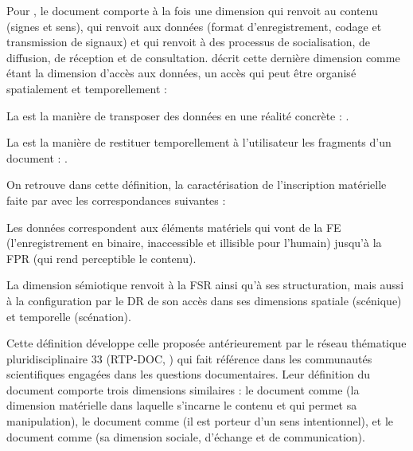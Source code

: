 Pour \cite{Leleu-Merviel2004}, le document comporte à la fois une dimension  qui renvoit au contenu (signes et sens),  qui renvoit aux données (format d'enregistrement, codage et transmission de signaux) et  qui renvoit à des processus de socialisation, de diffusion, de réception et de consultation.
\cite{Leleu-Merviel2005} décrit cette dernière dimension comme étant la dimension d'accès aux données, un accès qui peut être organisé spatialement et temporellement :
\begin{liste}
	\item La  est la manière de transposer des données en une réalité concrète : . %
	\item La  est la manière de restituer temporellement à l'utilisateur les fragments d'un document : . %
\end{liste}

On retrouve dans cette définition, la caractérisation de l'inscription matérielle faite par \cite{bachimont:icc} avec les correspondances suivantes : 
\begin{liste}
	\item Les données correspondent aux éléments matériels qui vont de la FE (l'enregistrement en binaire, inaccessible et illisible pour l'humain) jusqu'à la FPR (qui rend perceptible le contenu). 
	\item La dimension sémiotique renvoit à la FSR ainsi qu'à ses structuration, mais aussi à la configuration par le DR de son accès dans ses dimensions spatiale (scénique) et temporelle (scénation).
\end{liste}

Cette définition développe celle proposée antérieurement par le réseau thématique pluridisciplinaire 33 (RTP-DOC, \cite{Pedauque2003}) qui fait référence dans les communautés scientifiques engagées dans les questions documentaires.
Leur définition du document comporte trois dimensions similaires : le document comme  (la dimension matérielle dans laquelle s’incarne le contenu et qui permet sa manipulation), le document comme  (il est porteur d’un sens intentionnel), et le document comme  (sa dimension sociale, d'échange et de communication).

